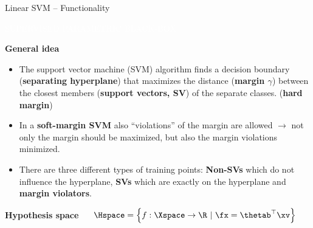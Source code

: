 \documentclass[11pt,compress,t,notes=noshow, xcolor=table]{beamer}
\newcommand{\maketag}[1]{\colorbox{highlightcol}{\textcolor{white}
{\MakeUppercase{#1}}}}
\newcommand{\highlight}[1]{\textcolor{highlightcol}{\textbf{#1}}}
\begin{document}
\begin{frame}{Linear SVM -- Functionality}

\footnotesize

\maketag{SUPERVISED}
\maketag{PARAMETRIC}
\maketag{BLACK-BOX}

\medskip

\highlight{General idea}
\begin{itemize}


  \item The support vector machine (SVM) algorithm finds a decision boundary (\textbf{separating hyperplane}) that maximizes the distance (\textbf{margin $\gamma$}) between the closest members (\textbf{support vectors, SV}) of the separate classes. (\textbf{hard margin})
  
  
  \item In a \textbf{soft-margin SVM} also \enquote{violations} of the margin are allowed $\rightarrow$ not only the margin should be maximized, but also the margin violations minimized. 
  
  
  \item There are three different types of training points: \textbf{Non-SVs} which do not influence the hyperplane, \textbf{SVs} which are exactly on the hyperplane and \textbf{margin violators}. 
  
  
  
  


\end{itemize}

\medskip


\highlight{Hypothesis space} ~~
\textcolor{red}{$\Hspace = \left\{f: \Xspace \to \R ~|~\fx = \thetab^\top \xv\right\}$}


\end{frame}
\end{document}
